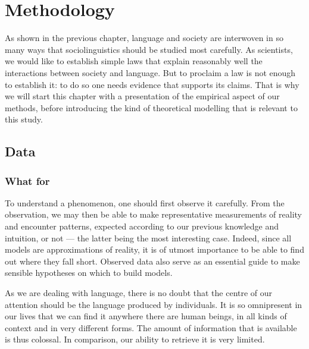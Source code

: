 \documentclass[../thesis.tex]{subfiles}
\begin{document}
\chapter{Methodology}
\label{ch:methods}

As shown in the previous chapter, language and society are interwoven in so many ways
that sociolinguistics should be studied most carefully. As scientists, we would like to
establish simple laws that explain reasonably well the interactions between society and
language. But to proclaim a law is not enough to establish it: to do so one needs
evidence that supports its claims. That is why we will start this chapter with a
presentation of the empirical aspect of our methods, before introducing the kind of
theoretical modelling that is relevant to this study.




\section{Data}
\subsection{What for}
To understand a phenomenon, one should first observe it carefully. From the observation,
we may then be able to make representative measurements of reality and encounter
patterns, expected according to our previous knowledge and intuition, or not --- the
latter being the most interesting case. Indeed, since all models are approximations of
reality, it is of utmost importance to be able to find out where they fall short.
Observed data also serve as an essential guide to make sensible hypotheses on which to
build models.

As we are dealing with language, there is no doubt that the centre of our attention
should be the language produced by individuals. It is so omnipresent in our lives that
we can find it anywhere there are human beings, in all kinds of context and in very
different forms. The amount of information that is available is thus colossal. In
comparison, our ability to retrieve it is very limited.
\end{document}
